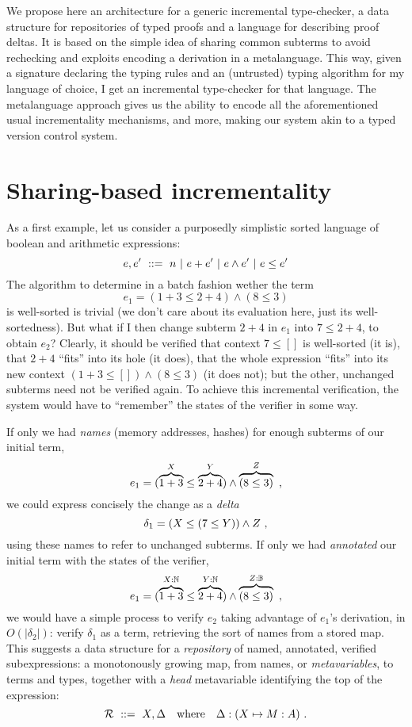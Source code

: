 \documentclass[9pt,authoryear]{sigplanconf}
\begin{document}
We propose here an architecture for a generic incremental
type-checker, a data structure for repositories of typed proofs and a
language for describing proof deltas. It is based on the simple idea
of sharing common subterms to avoid rechecking and exploits encoding a
derivation in a metalanguage. This way, given a signature declaring
the typing rules and an (untrusted) typing algorithm for my language
of choice, I get an incremental type-checker for that language. The
metalanguage approach gives us the ability to encode all the
aforementioned usual incrementality mechanisms, and more, making our
system akin to a typed version control system.

\section{Sharing-based incrementality}

As a first example, let us consider a purposedly simplistic sorted
language of boolean and arithmetic expressions:
$$ e, e' \ ::=\  n \ |\  e + e' \ |\  e \land e' \ |\  e \leq e' $$
The algorithm to determine in a batch fashion wether the term
$$ e_1 = (1 + 3 \leq 2 + 4) \land (8 \leq 3) $$ is well-sorted is
trivial (we don't care about its evaluation here, just its
well-sortedness). But what if I then change subterm $2+4$ in $e_1$
into $7 \leq 2+4$, to obtain $e_2$? Clearly, it should be verified
that context $7\leq []$ is well-sorted (it is), that $2+4$ ``fits''
into its hole (it does), that the whole expression ``fits'' into its
new context $(1+3\leq [])\land(8\leq 3)$ (it does not); but the other,
unchanged subterms need not be verified again. To achieve this
incremental verification, the system would have to ``remember'' the
states of the verifier in some way.

If only we had \emph{names} (memory addresses, hashes) for enough
subterms of our initial term, $$ e_1 = (\overbrace{1 + 3}^\mmeta \leq
\overbrace{2+4}^\mmmeta) \land \overbrace{(8 \leq 3)}^\mmmmeta\text{\
  ,} $$ we could express concisely the change as a
\emph{delta} $$\delta_1 = (\mmeta\leq(7\leq \mmmeta))\land \mmmmeta
\text{\ ,}$$ using these names to refer to unchanged subterms. If only
we had \emph{annotated} our initial term with the states of the
verifier,
$$e_1 = (\overbrace{1 + 3}^{\mmeta:\nat} \leq \overbrace{2 +
  4}^{\mmmeta:\nat}) \land \overbrace{(8 \leq
  3)}^{\mmmmeta:\bool}\text{\ ,} $$ we would have a simple process to
verify $e_2$ taking advantage of $e_1$'s derivation, in
$O(|\delta_2|)$: verify $\delta_1$ as a term, retrieving the sort of
names from a stored map. This suggests a data structure for a
\emph{repository} of named, annotated, verified subexpressions: a
monotonously growing map, from names, or \emph{metavariables}, to terms
and types, together with a \emph{head} metavariable identifying the
top of the expression: $$\mr \gequal X, \Delta \quad\text{where}\quad
\Delta : (\mmeta\mapsto M : A) \text{\ .}$$
\end{document}

